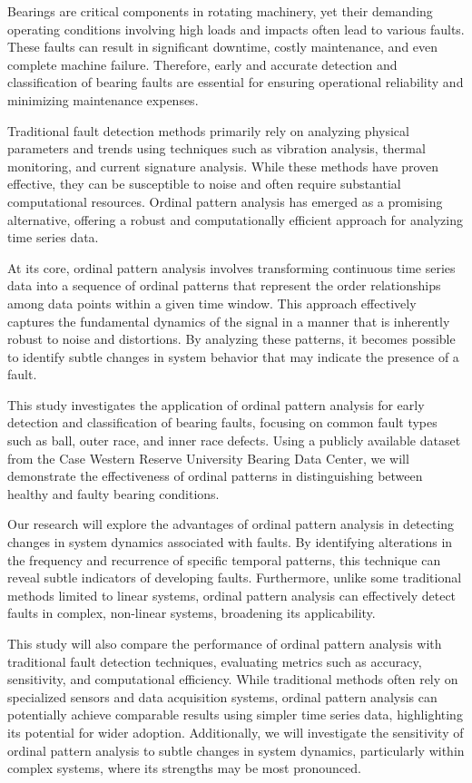 \documentclass[sn-basic,pdflatex]{sn-jnl}
\theoremstyle{remark}
\theoremstyle{definition}
\begin{document}
Bearings are critical components in rotating machinery, yet their
demanding operating conditions involving high loads and impacts often
lead to various faults. These faults can result in significant downtime,
costly maintenance, and even complete machine failure. Therefore, early
and accurate detection and classification of bearing faults are
essential for ensuring operational reliability and minimizing
maintenance expenses.

Traditional fault detection methods primarily rely on analyzing physical
parameters and trends using techniques such as vibration analysis,
thermal monitoring, and current signature analysis. While these methods
have proven effective, they can be susceptible to noise and often
require substantial computational resources. Ordinal pattern analysis
has emerged as a promising alternative, offering a robust and
computationally efficient approach for analyzing time series data.

At its core, ordinal pattern analysis involves transforming continuous
time series data into a sequence of ordinal patterns that represent the
order relationships among data points within a given time window. This
approach effectively captures the fundamental dynamics of the signal in
a manner that is inherently robust to noise and distortions. By
analyzing these patterns, it becomes possible to identify subtle changes
in system behavior that may indicate the presence of a fault.

This study investigates the application of ordinal pattern analysis for
early detection and classification of bearing faults, focusing on common
fault types such as ball, outer race, and inner race defects. Using a
publicly available dataset from the Case Western Reserve University
Bearing Data Center, we will demonstrate the effectiveness of ordinal
patterns in distinguishing between healthy and faulty bearing
conditions.

Our research will explore the advantages of ordinal pattern analysis in
detecting changes in system dynamics associated with faults. By
identifying alterations in the frequency and recurrence of specific
temporal patterns, this technique can reveal subtle indicators of
developing faults. Furthermore, unlike some traditional methods limited
to linear systems, ordinal pattern analysis can effectively detect
faults in complex, non-linear systems, broadening its applicability.

This study will also compare the performance of ordinal pattern analysis
with traditional fault detection techniques, evaluating metrics such as
accuracy, sensitivity, and computational efficiency. While traditional
methods often rely on specialized sensors and data acquisition systems,
ordinal pattern analysis can potentially achieve comparable results
using simpler time series data, highlighting its potential for wider
adoption. Additionally, we will investigate the sensitivity of ordinal
pattern analysis to subtle changes in system dynamics, particularly
within complex systems, where its strengths may be most pronounced.
\end{document}
